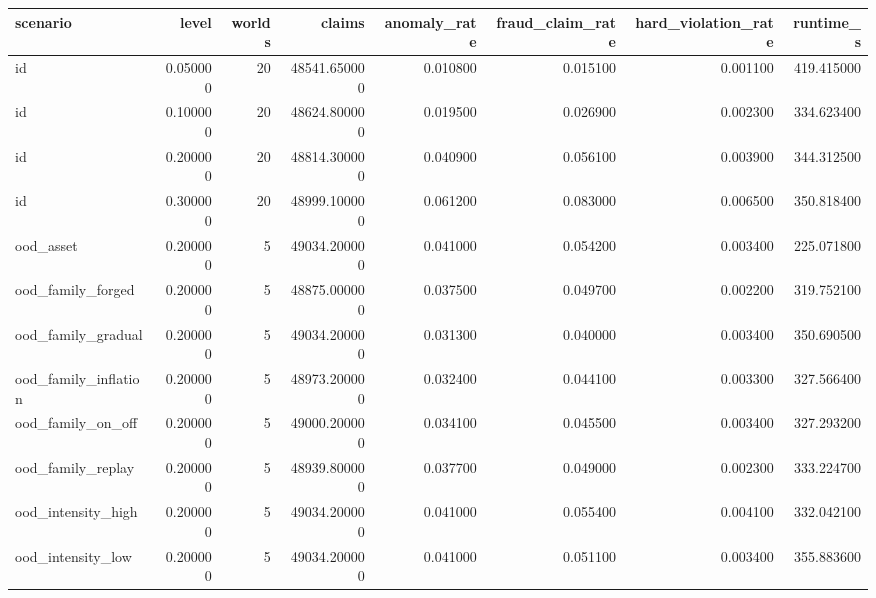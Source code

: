 \begin{tabular}{lrrrrrrr}
\toprule
scenario & level & worlds & claims & anomaly\_rate & fraud\_claim\_rate & hard\_violation\_rate & runtime\_s \\
\midrule
id & 0.050000 & 20 & 48541.650000 & 0.010800 & 0.015100 & 0.001100 & 419.415000 \\
id & 0.100000 & 20 & 48624.800000 & 0.019500 & 0.026900 & 0.002300 & 334.623400 \\
id & 0.200000 & 20 & 48814.300000 & 0.040900 & 0.056100 & 0.003900 & 344.312500 \\
id & 0.300000 & 20 & 48999.100000 & 0.061200 & 0.083000 & 0.006500 & 350.818400 \\
ood\_asset & 0.200000 & 5 & 49034.200000 & 0.041000 & 0.054200 & 0.003400 & 225.071800 \\
ood\_family\_forged & 0.200000 & 5 & 48875.000000 & 0.037500 & 0.049700 & 0.002200 & 319.752100 \\
ood\_family\_gradual & 0.200000 & 5 & 49034.200000 & 0.031300 & 0.040000 & 0.003400 & 350.690500 \\
ood\_family\_inflation & 0.200000 & 5 & 48973.200000 & 0.032400 & 0.044100 & 0.003300 & 327.566400 \\
ood\_family\_on\_off & 0.200000 & 5 & 49000.200000 & 0.034100 & 0.045500 & 0.003400 & 327.293200 \\
ood\_family\_replay & 0.200000 & 5 & 48939.800000 & 0.037700 & 0.049000 & 0.002300 & 333.224700 \\
ood\_intensity\_high & 0.200000 & 5 & 49034.200000 & 0.041000 & 0.055400 & 0.004100 & 332.042100 \\
ood\_intensity\_low & 0.200000 & 5 & 49034.200000 & 0.041000 & 0.051100 & 0.003400 & 355.883600 \\
\bottomrule
\end{tabular}

